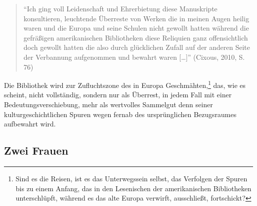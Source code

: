 \documentclass[output=paper]{langscibook}
\begin{document}
\begin{quote}
\enquote{Ich ging voll Leidenschaft und Ehrerbietung diese Manuskripte
konsultieren, leuchtende Überreste von Werken die in meinen Augen heilig
waren und die Europa und seine Schulen nicht gewollt hatten während die
gefräßigen amerikanischen Bibliotheken diese Reliquien ganz
offensichtlich doch gewollt hatten die also durch glücklichen Zufall auf
der anderen Seite der Verbannung aufgenommen und bewahrt waren
{[}\ldots{]}} (Cixous, 2010, S. 76)
\end{quote}

\noindent Die Bibliothek wird zur Zufluchtszone des in Europa
Geschmähten,\footnote{Sind es die Reisen, ist es das Unterwegssein
  selbst, das Verfolgen der Spuren bis zu einem Anfang, das in den
  Lesenischen der amerikanischen Bibliotheken unterschlüpft, während es
  das alte Europa verwirft, ausschließt, fortschickt?} das, wie es
scheint, nicht vollständig, sondern nur als Überrest, in jedem Fall mit
einer Bedeutungsverschiebung, mehr als wertvolles Sammelgut denn seiner
kulturgeschichtlichen Spuren wegen fernab des ursprünglichen
Bezugsraumes aufbewahrt wird.

\hypertarget{zwei-frauen}{%
\subsection*{Zwei Frauen}\label{zwei-frauen}}
\end{document}
